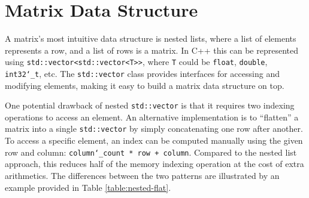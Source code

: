 \documentclass[logo,bsc,singlespacing,parskip]{infthesis}
\newcommand{\dtint}{\texttt{int32\char`_t}}
\newcommand{\dtfloat}{\texttt{float}}
\newcommand{\dtdouble}{\texttt{double}}
\begin{document}
\section{Matrix Data Structure}
\label{sec:mat-structure}
A matrix's most intuitive data structure is nested lists, where a list of elements represents a row, and a list of rows is a matrix. In C++ this can be represented using \texttt{std::vector<std::vector<T>>}, where \texttt{T} could be \dtfloat{}, \dtdouble{}, \dtint{}, etc. The \texttt{std::vector} class provides interfaces for accessing and modifying elements, making it easy to build a matrix data structure on top. 

One potential drawback of nested \texttt{std::vector} is that it requires two indexing operations to access an element. An alternative implementation is to “flatten” a matrix into a single \texttt{std::vector} by simply concatenating one row after another. To access a specific element, an index can be computed manually using the given row and column: \texttt{column\char`_count * row + column}. Compared to the nested list approach, this reduces half of the memory indexing operation at the cost of extra arithmetics. The differences between the two patterns are illustrated by an example provided in Table \ref{table:nested-flat}. 
\end{document}
